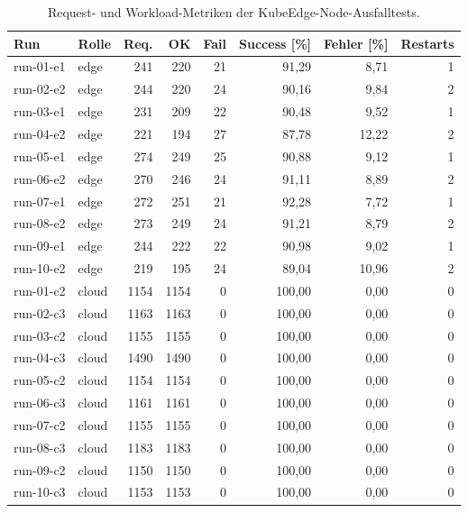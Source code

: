 \begin{table}[H]
\centering
\begin{tabular}{llrrrrrr}
\toprule
\textbf{Run} & \textbf{Rolle} & \textbf{Req.} & \textbf{OK} & \textbf{Fail} & \textbf{Success [\%]} & \textbf{Fehler [\%]} & \textbf{Restarts} \\
\midrule
run-01-e1 & edge & 241 & 220 & 21 & 91,29 & 8,71 & 1 \\
run-02-e2 & edge & 244 & 220 & 24 & 90,16 & 9,84 & 2 \\
run-03-e1 & edge & 231 & 209 & 22 & 90,48 & 9,52 & 1 \\
run-04-e2 & edge & 221 & 194 & 27 & 87,78 & 12,22 & 2 \\
run-05-e1 & edge & 274 & 249 & 25 & 90,88 & 9,12 & 1 \\
run-06-e2 & edge & 270 & 246 & 24 & 91,11 & 8,89 & 2 \\
run-07-e1 & edge & 272 & 251 & 21 & 92,28 & 7,72 & 1 \\
run-08-e2 & edge & 273 & 249 & 24 & 91,21 & 8,79 & 2 \\
run-09-e1 & edge & 244 & 222 & 22 & 90,98 & 9,02 & 1 \\
run-10-e2 & edge & 219 & 195 & 24 & 89,04 & 10,96 & 2 \\
run-01-c2 & cloud & 1154 & 1154 & 0 & 100,00 & 0,00 & 0 \\
run-02-c3 & cloud & 1163 & 1163 & 0 & 100,00 & 0,00 & 0 \\
run-03-c2 & cloud & 1155 & 1155 & 0 & 100,00 & 0,00 & 0 \\
run-04-c3 & cloud & 1490 & 1490 & 0 & 100,00 & 0,00 & 0 \\
run-05-c2 & cloud & 1154 & 1154 & 0 & 100,00 & 0,00 & 0 \\
run-06-c3 & cloud & 1161 & 1161 & 0 & 100,00 & 0,00 & 0 \\
run-07-c2 & cloud & 1155 & 1155 & 0 & 100,00 & 0,00 & 0 \\
run-08-c3 & cloud & 1183 & 1183 & 0 & 100,00 & 0,00 & 0 \\
run-09-c2 & cloud & 1150 & 1150 & 0 & 100,00 & 0,00 & 0 \\
run-10-c3 & cloud & 1153 & 1153 & 0 & 100,00 & 0,00 & 0 \\
\bottomrule
\end{tabular}
\caption{Request- und Workload-Metriken der KubeEdge-Node-Ausfalltests.}
\label{tab:appendix-kubeedge-node-failure-requests}
\end{table}
